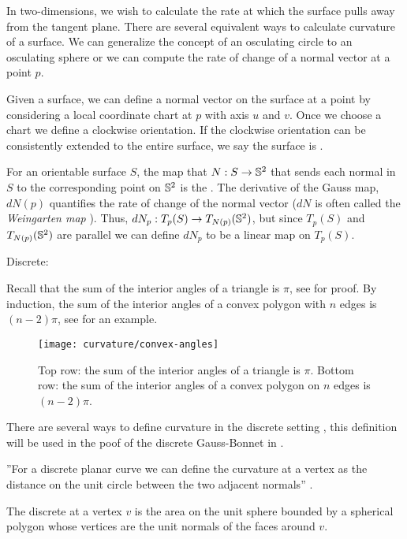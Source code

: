 In two-dimensions, we wish to calculate the rate at which the surface
pulls away from the tangent plane.  There are several equivalent ways 
to calculate curvature of a surface.
We can generalize the concept of an osculating circle to an
osculating sphere or we can compute the rate of change of
a normal vector at a point $p$.

Given a surface, we can define a normal vector on the surface at  a point
by considering a local coordinate chart at $p$ with axis $u$ and $v$.
Once we choose a chart we define a clockwise orientation. If the clockwise
orientation can be consistently extended to the entire surface, we say
the surface is .

For an orientable surface $S$, the map that  $N:S\to \mathbb{S}^2$ that sends each
normal in $S$ to the corresponding point on $\mathbb{S}^2$ is
the .
The derivative of the Gauss map, $dN(p)$ quantifies the rate of change of
the normal vector ($dN$ is often called the \emph{Weingarten map} \cite{Crane:2013}).
Thus, $dN_p:T_p(S)\to T_{N(p)}(\mathbb{S}^2)$, but since $T_p(S)$ and $T_{N(p)}(\mathbb{S}^2)$
are parallel we can define $dN_p$ to be a linear map on $T_p(S)$.

Discrete:

Recall that the sum of the interior angles of a triangle is $\pi$,
see  for proof. By induction, the sum of the interior angles
of a convex polygon with $n$ edges is  $(n-2)\pi$, see 
for an example. 

\begin{figure}[htb]
\centering
\texttt{[image: curvature/convex-angles]}
\caption{Top row: the sum of  the interior angles of a triangle is $\pi$.
Bottom row: the sum of the interior angles of a convex polygon on $n$ edges is $(n-2)\pi$.}
\label{fig:angles}
\end{figure}


There are several ways to define curvature in the discrete setting \cite{Crane:2013},
this definition will be used in the poof of the discrete Gauss-Bonnet in .

''For a discrete planar curve we can define the curvature at a vertex as the distance on the unit circle between the two adjacent normals'' \cite{Crane:2013}.

\begin{definition}\label{def:discrete-curvature-vertex}

The discrete  at a vertex $v$ is the area on the unit sphere bounded by a spherical polygon whose vertices are the unit normals of the faces around $v$.

\end{definition}


